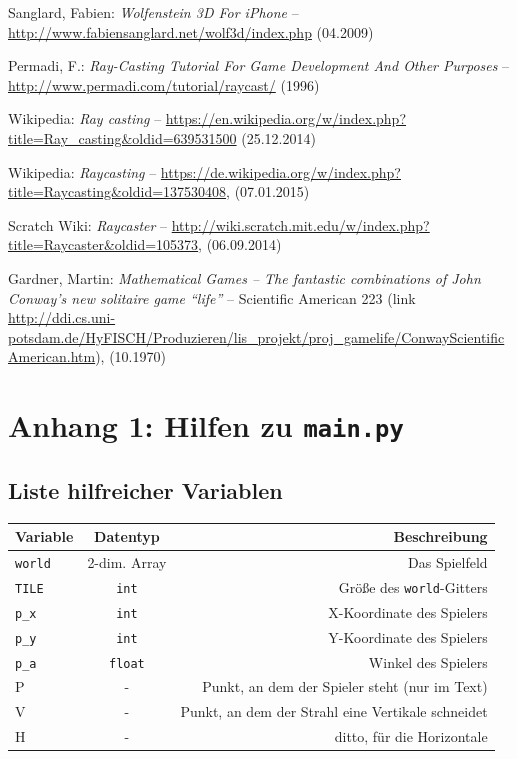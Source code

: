 \documentclass[a4paper,12pt]{report}
\begin{document}
\begin{thebibliography}{9}

  Sanglard, Fabien:
  \emph{Wolfenstein 3D For iPhone} -- 
  \url{http://www.fabiensanglard.net/wolf3d/index.php}
  (04.2009)

  Permadi, F.:
  \emph{Ray-Casting Tutorial For Game Development And Other Purposes} --
  \url{http://www.permadi.com/tutorial/raycast/}
  (1996)

  Wikipedia:
  \emph{Ray casting} -- 
  \url{https://en.wikipedia.org/w/index.php?title=Ray_casting&oldid=639531500}
  (25.12.2014)

  Wikipedia:
  \emph{Raycasting} --
  \url{https://de.wikipedia.org/w/index.php?title=Raycasting&oldid=137530408},
  (07.01.2015)

  Scratch Wiki:
  \emph{Raycaster} --
  \url{http://wiki.scratch.mit.edu/w/index.php?title=Raycaster&oldid=105373},
  (06.09.2014)
  
  Gardner, Martin:
  \emph{ Mathematical Games – The fantastic combinations of John Conway's new solitaire game ``life''} --
  Scientific American 223 (link \url{http://ddi.cs.uni-potsdam.de/HyFISCH/Produzieren/lis_projekt/proj_gamelife/ConwayScientificAmerican.htm}),
  (10.1970)

\end{thebibliography}

\appendix

\chapter{Anhang 1: Hilfen zu \texttt{main.py}}
\section{Liste hilfreicher Variablen}
\begin{center}
	\begin{tabular}{|l|c|r|}
		\hline
		Variable & Datentyp & Beschreibung \\ \hline
		\hline
		\texttt{world} & 2-dim. Array & Das Spielfeld \\ \hline
		\texttt{TILE} & \texttt{int} & Gr\"o\ss e des \texttt{world}-Gitters \\ \hline
		\texttt{p\_x} & \texttt{int} & X-Koordinate des Spielers \\ \hline
		\texttt{p\_y} & \texttt{int} & Y-Koordinate des Spielers \\ \hline
		\texttt{p\_a} & \texttt{float} & Winkel des Spielers \\ \hline
		P & - & Punkt, an dem der Spieler steht (nur im Text) \\ \hline
		V & - & Punkt, an dem der Strahl eine Vertikale schneidet \\ \hline
		H & - & ditto, f\"ur die Horizontale \\ \hline
	\end{tabular}
\end{center}
\end{document}
